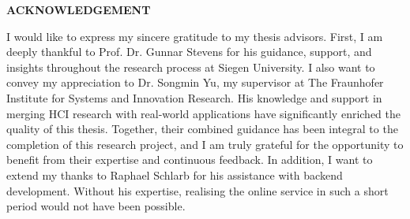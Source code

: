  \setcounter{page}{2}
\begin{center}
    {\Large{\bf{ACKNOWLEDGEMENT}}}
\end{center}

\noindent
I would like to express my sincere gratitude to my thesis advisors. 
First, I am deeply thankful to Prof. Dr. Gunnar Stevens for his guidance, support, and insights throughout the research process at Siegen University. 
I also want to convey my appreciation to Dr. Songmin Yu, my supervisor at The Fraunhofer Institute for Systems and Innovation Research. 
His knowledge and support in merging HCI research with real-world applications have significantly enriched the quality of this thesis.
Together, their combined guidance has been integral to the completion of this research project, and I am truly grateful for the opportunity to benefit from their expertise and continuous feedback. 
In addition, I want to extend my thanks to Raphael Schlarb for his assistance with backend development. 
Without his expertise, realising the online service in such a short period would not have been possible.
\clearpage